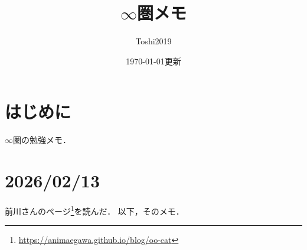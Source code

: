 \newcommand{\cotn}[1][]{\dot{T}^{\ast}{#1}}


\newcommand{\muhom}{\mu hom}
\newcommand{\muHom}[1][]{\mathrm{Hom}^\mu_{\raise1.5ex\hbox to.1em{}#1}}

\newcommand{\mucat}[2][]{\mathsf{D}^{\mathrm{b}}_{#1}(#2)}

\newcommand{\conv}[1][]{\mathbin{\mathop{\circ}\limits_{#1}}}


\newcommand{\lopen}{\mathopen{(}}
\newcommand{\lclosed}{\mathopen{[}}
\newcommand{\ropen}{\mathclose{)}}
\newcommand{\rclosed}{\mathopen{]}}

\newcommand{\sm}{\raisebox{2.33pt}{~\rule{6.4pt}{1.3pt}~}}
\newcommand{\smi}{-}

\newcommand{\smid}{\mathrel{;}}

\newcommand{\torus}{\mathbf{T}}
\newcommand{\eu}{\mathbf{e}}
\newcommand{\rrp}{\rr^{+}}

\newcommand{\sheaf}[1]{\mathcal{#1}}
\newcommand{\structuresheaf}[1]{\sheaf{R}_{#1}}

\DeclareMathOperator{\Car}{Car}

\newcommand{\Cat}{\mathsf{Cat}}
\newcommand{\Anima}{\mathsf{Anima}}

\DeclareMathOperator{\QCoh}{QCoh}



\title{\(\infty\)圏メモ}
\author{Toshi2019}
\date{\today 更新}

\maketitle
\tableofcontents
\section{はじめに}
\(\infty\)圏の勉強メモ．

\section{2026/02/13}
前川さんのページ\footnote{\url{https://animaegawa.github.io/blog/oo-cat}}を読んだ．
以下，そのメモ．

